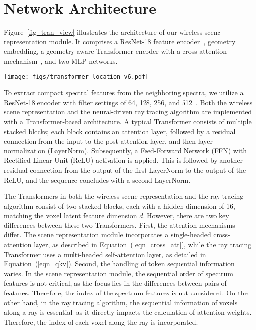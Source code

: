 \section{Network Architecture}\label{appendix_network}

Figure~\ref{fig_tran_view} illustrates the architecture of our wireless scene representation module. 
It comprises a ResNet-18 feature encoder~\cite{he2016deep}, geometry embedding, a geometry-aware Transformer encoder with a cross-attention mechanism~\cite{gheini2021cross}, and two MLP networks.


\begin{figure*}[t]
\centering
{\texttt{[image: figs/transformer\_location\_v6.pdf]}}
\caption{Architecture of geometry-aware wireless scene representation module, consisting of a ResNet feature extractor, geometry embedding, a Transformer encoder, and two MLPs, where a circle with a plus symbol signifies concatenation.}
	\label{fig_tran_view}
\end{figure*}




To extract compact spectral features from the neighboring spectra, we utilize a ResNet-18 encoder with filter settings of 64, 128, 256, and 512~\cite{he2016deep}.
Both the wireless scene representation and the neural-driven ray tracing algorithm are implemented with a Transformer-based architecture.
A typical Transformer consists of multiple stacked blocks; each block contains an attention layer, followed by a residual connection from the input to the post-attention layer, and then layer normalization (LayerNorm).
Subsequently, a Feed-Forward Network (FFN) with Rectified Linear Unit (ReLU) activation is applied.
This is followed by another residual connection from the output of the first LayerNorm to the output of the ReLU, and the sequence concludes with a second LayerNorm.



The Transformers in both the wireless scene representation and the ray tracing algorithm consist of two stacked blocks, each with a hidden dimension of 16, matching the voxel latent feature dimension \( d \). 
However, there are two key differences between these two Transformers. 
First, the attention mechanisms differ. 
The scene representation module incorporates a single-headed cross-attention layer, as described in Equation~(\ref{eqn_cross_att}), while the ray tracing Transformer uses a multi-headed self-attention layer, as detailed in Equation~(\ref{eqn_qkv}).
Second, the handling of token sequential information varies. 
In the scene representation module, the sequential order of spectrum features is not critical, as the focus lies in the differences between pairs of features. 
Therefore, the index of the spectrum features is not considered. 
On the other hand, in the ray tracing algorithm, the sequential information of voxels along a ray is essential, as it directly impacts the calculation of attention weights. 
Therefore, the index of each voxel along the ray is incorporated.


